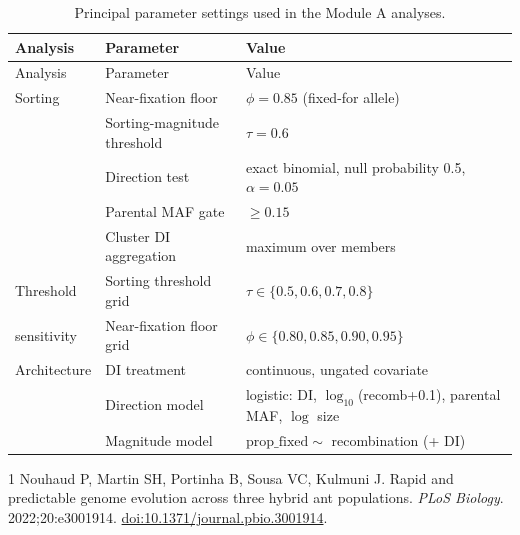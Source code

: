 \documentclass[11pt]{article}
\begin{document}
\begin{longtable}{>{\raggedright\arraybackslash}p{}
                  >{\raggedright\arraybackslash}p{}
                  >{\raggedright\arraybackslash}p{}}
\caption{Principal parameter settings used in the Module A analyses.}
\label{tab:parameters}\\
\toprule
Analysis & Parameter & Value \\
\midrule
\endfirsthead
\toprule
Analysis & Parameter & Value \\
\midrule
\endhead
Sorting & Near-fixation floor & \(\phi=0.85\) (fixed-for allele) \\
        & Sorting-magnitude threshold & \(\tau=0.6\) \\
        & Direction test & exact binomial, null probability 0.5, \(\alpha=0.05\) \\
        & Parental MAF gate & \(\geq0.15\) \\
        & Cluster DI aggregation & maximum over members \\
\midrule
Threshold & Sorting threshold grid & \(\tau\in\{0.5,0.6,0.7,0.8\}\) \\
sensitivity & Near-fixation floor grid & \(\phi\in\{0.80,0.85,0.90,0.95\}\) \\
\midrule
Architecture & DI treatment & continuous, ungated covariate \\
             & Direction model & logistic: DI, \(\log_{10}\)(recomb+0.1), parental MAF, \(\log\) size \\
             & Magnitude model & \(\mathrm{prop\_fixed}\sim\) recombination (+ DI) \\
\bottomrule
\end{longtable}

\begin{thebibliography}{1}
Nouhaud P, Martin SH, Portinha B, Sousa VC, Kulmuni J. Rapid and
predictable genome evolution across three hybrid ant populations.
\textit{PLoS Biology}. 2022;20:e3001914.
\href{https://doi.org/10.1371/journal.pbio.3001914}
{doi:10.1371/journal.pbio.3001914}.
\end{thebibliography}
\end{document}
